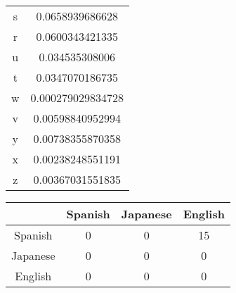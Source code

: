 \documentclass{article}
\begin{document}
\begin{center}
\begin{tabular}{c|c}
s & 0.0658939686628 \\
r & 0.0600343421335 \\
u & 0.034535308006 \\
t & 0.0347070186735 \\
w & 0.000279029834728 \\
v & 0.00598840952994 \\
y & 0.00738355870358 \\
x & 0.00238248551191 \\
z & 0.00367031551835 \\
\end{tabular}\end{center}

\begin{center}
\begin{tabular}{|c|c|c|c|}
\hline & Spanish & Japanese & English \\ \hline
Spanish & 0 & 0 & 15 \\ \hline
Japanese & 0 & 0 & 0 \\ \hline
English & 0 & 0 & 0 \\ \hline
\end{tabular}
\end{center}
\end{document}
